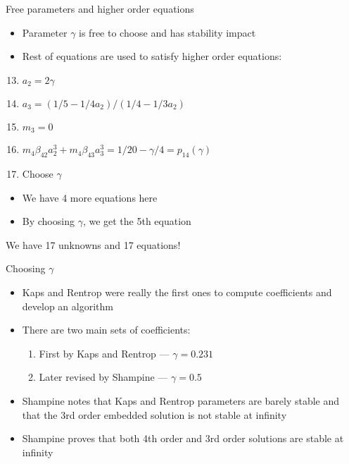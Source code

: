 \documentclass[serif]{beamer}
\begin{document}
\begin{frame}{Free parameters and higher order equations}
  \begin{itemize}
   \item<1-> Parameter $\gamma$ is free to choose and has stability impact
   \item<1-> Rest of equations are used to satisfy higher order equations:
  \end{itemize}
  \begin{enumerate}
   \setcounter{enumi}{12}
   \item<1-> $a_2 = 2\gamma$
   \item<1-> $a_3 = \left(1/5 - 1/4a_2\right)/\left(1/4 - 1/3a_2\right)$
   \item<1-> $m_3 = 0$
   \item<1-> $m_4\beta_{42}a_2^3 + m_4\beta_{43}a_3^3 = 1/20 - \gamma/4 = p_{14}\left(\gamma\right)$
   \item<1-> Choose $\gamma$
  \end{enumerate}
  \begin{itemize}
   \item<1-> We have 4 more equations here
   \item<1-> By choosing $\gamma$, we get the 5th equation
  \end{itemize}
  \begin{center}
    \alert{We have 17 unknowns and 17 equations!} 
  \end{center}
\end{frame}
\begin{frame}{Choosing $\gamma$}
  \begin{itemize}
    \item Kaps and Rentrop were really the first ones to compute coefficients and develop an algorithm \vfill
    \item There are two main sets of coefficients: \vfill
    \begin{enumerate}
      \item First by Kaps and Rentrop --- $\gamma = 0.231$
      \item Later revised by Shampine --- $\gamma = 0.5$
    \end{enumerate}
    \item Shampine notes that Kaps and Rentrop parameters are barely stable and that the 3rd order embedded solution is not stable at infinity\vfill
    \item Shampine proves that both 4th order and 3rd order solutions are stable at infinity
  \end{itemize}
\end{frame}
\end{document}
